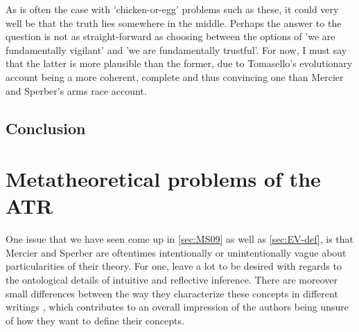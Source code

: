 As is often the case with 'chicken-or-egg' problems such as these, it could very well be that the truth lies somewhere in the middle. Perhaps the answer to the question is not as straight-forward as choosing between the options of 'we are fundamentally vigilant' and 'we are fundamentally trustful'. For now, I must say that the latter is more plausible than the former, due to Tomasello's evolutionary account being a more coherent, complete and thus convincing one than Mercier and Sperber's arms race account.


\subsection{Conclusion}


\section{Metatheoretical problems of the ATR}
\label{sec:ont-atr}

One issue that we have seen come up in \cref{sec:MS09} as well as \cref{sec:EV-def}, is that Mercier and Sperber are oftentimes intentionally or unintentionally vague about particularities of their theory.
For one, \citet{MS09} leave a lot to be desired with regards to the ontological details of intuitive and reflective inference.
There are moreover small differences between the way they characterize these concepts in different writings \citep{MS09, MS11}, which contributes to an overall impression of the authors being unsure of how they want to define their concepts.

